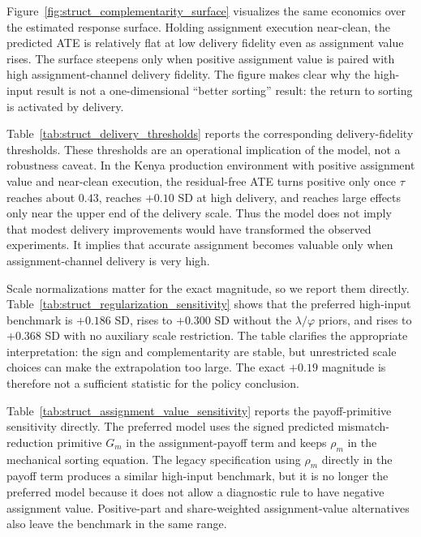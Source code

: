 \documentclass[11pt]{article}
\begin{document}


Figure~\ref{fig:struct_complementarity_surface} visualizes the same economics over the estimated response surface. Holding assignment execution near-clean, the predicted ATE is relatively flat at low delivery fidelity even as assignment value rises. The surface steepens only when positive assignment value is paired with high assignment-channel delivery fidelity. The figure makes clear why the high-input result is not a one-dimensional ``better sorting'' result: the return to sorting is activated by delivery.

Table~\ref{tab:struct_delivery_thresholds} reports the corresponding delivery-fidelity thresholds. These thresholds are an operational implication of the model, not a robustness caveat. In the Kenya production environment with positive assignment value and near-clean execution, the residual-free ATE turns positive only once $\tau$ reaches about $0.43$, reaches $+0.10$ SD at high delivery, and reaches large effects only near the upper end of the delivery scale. Thus the model does not imply that modest delivery improvements would have transformed the observed experiments. It implies that accurate assignment becomes valuable only when assignment-channel delivery is very high.



Scale normalizations matter for the exact magnitude, so we report them directly. Table~\ref{tab:struct_regularization_sensitivity} shows that the preferred high-input benchmark is $+0.186$ SD, rises to $+0.300$ SD without the $\lambda/\varphi$ priors, and rises to $+0.368$ SD with no auxiliary scale restriction. The table clarifies the appropriate interpretation: the sign and complementarity are stable, but unrestricted scale choices can make the extrapolation too large. The exact $+0.19$ magnitude is therefore not a sufficient statistic for the policy conclusion.



Table~\ref{tab:struct_assignment_value_sensitivity} reports the payoff-primitive sensitivity directly. The preferred model uses the signed predicted mismatch-reduction primitive $G_m$ in the assignment-payoff term and keeps $\rho_m$ in the mechanical sorting equation. The legacy specification using $\rho_m$ directly in the payoff term produces a similar high-input benchmark, but it is no longer the preferred model because it does not allow a diagnostic rule to have negative assignment value. Positive-part and share-weighted assignment-value alternatives also leave the benchmark in the same range.
\end{document}
